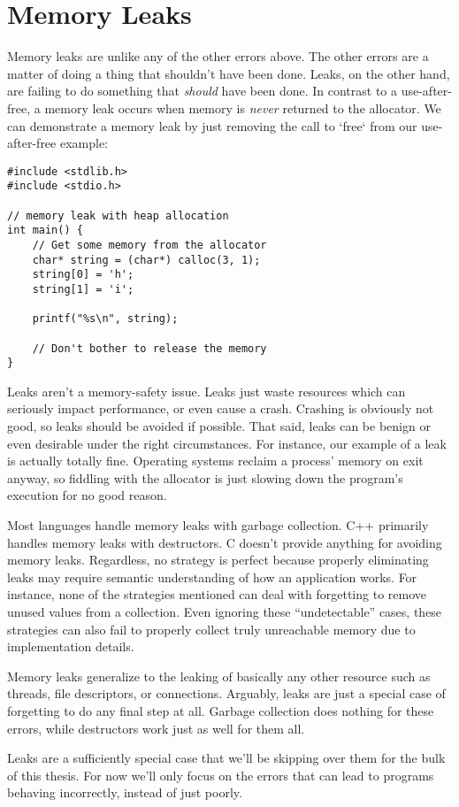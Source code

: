 \section{Memory Leaks}

Memory leaks are unlike any of the other errors above. The other errors are a matter
of doing a thing that shouldn't have been done. Leaks, on the other hand, are
failing to do something that \emph{should} have been done. In contrast to a
use-after-free, a memory leak occurs when memory is \emph{never} returned to the allocator.
We can demonstrate a memory leak by just removing the call to `free` from our
use-after-free example:

\begin{verbatim}
#include <stdlib.h>
#include <stdio.h>

// memory leak with heap allocation
int main() {
    // Get some memory from the allocator
    char* string = (char*) calloc(3, 1);
    string[0] = 'h';
    string[1] = 'i';

    printf("%s\n", string);

    // Don't bother to release the memory
}
\end{verbatim}

Leaks aren't a memory-safety issue. Leaks just waste resources which can
seriously impact performance, or even cause a crash. Crashing is obviously not
good, so leaks should be avoided if possible. That said, leaks can be benign or
even desirable under the right circumstances. For instance, our example of a
leak is actually totally fine. Operating systems reclaim a process' memory on
exit anyway, so fiddling with the allocator is just slowing down the program's
execution for no good reason.

Most languages handle memory leaks with garbage collection. C++ primarily
handles memory leaks with destructors. C doesn't provide anything for avoiding
memory leaks. Regardless, no strategy is perfect because properly eliminating
leaks may require semantic understanding of how an application works. For
instance, none of the strategies mentioned can deal with forgetting to remove
unused values from a collection. Even ignoring these ``undetectable'' cases,
these strategies can also fail to properly collect truly unreachable memory
due to implementation details.

Memory leaks generalize to the leaking of basically any other resource such
as threads, file descriptors, or connections. Arguably, leaks are just a special
case of forgetting to do any final step at all. Garbage collection does nothing
for these errors, while destructors work just as well for them all.

Leaks are a sufficiently special case that we'll be skipping over them for
the bulk of this thesis. For now we'll only focus on the errors that can lead
to programs behaving incorrectly, instead of just poorly.


